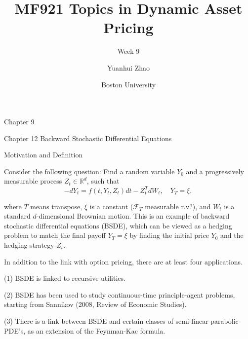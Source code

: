 \documentclass{beamer}
\title{MF921 Topics in Dynamic Asset Pricing}
\subtitle{Week 9}
\author{Yuanhui Zhao}
\date{Boston University}
\begin{document}
\frame{\titlepage}


\begin{frame}{Chapter 9}

    {
    \begin{center}
        Chapter 12 Backward Stochastic Differential Equations
    \end{center}
    }
    
\end{frame}

\begin{frame}{Motivation and Definition}

    {\footnotesize \footnotesize
Consider the following question: Find a random variable \( Y_0 \) and a progressively measurable process \( Z_t \in \mathbb{R}^d \), such that
\[
-dY_t = f(t, Y_t, Z_t)dt - Z_t^T dW_t, \quad Y_T = \xi,
\]

where \( T \) means transpose, \( \xi \) is a constant ($\mathcal{F}_T$ measurable r.v?), 
and \( W_t \) is a standard \( d \)-dimensional Brownian motion. 
This is an example of backward stochastic differential equations (BSDE), 
which can be viewed as a hedging problem to match the final payoff \( Y_T = \xi \) 
by finding the initial price \( Y_0 \) and the hedging strategy \( Z_t \).
\vspace{1em}
\par  \pause In addition to the link with option pricing, there are at least four applications.

(1) BSDE is linked to recursive utilities.

(2) BSDE has been used to study continuous-time principle-agent problems, starting from Sannikov (2008, Review of Economic Studies).

(3) There is a link between BSDE and certain classes of semi-linear parabolic PDE's, as an extension of the Feynman-Kac formula.

    }
    
\end{frame}
\end{document}
